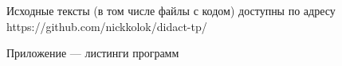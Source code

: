 
\LARGE




Исходные тексты (в том числе файлы с кодом) доступны по адресу https://github.com/nickkolok/didact-tp/





Приложение --- листинги программ





